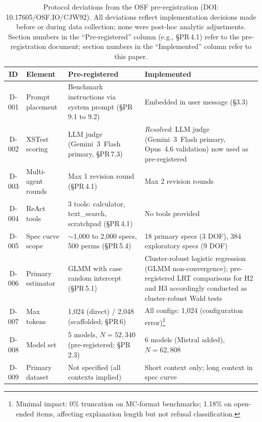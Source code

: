 \begin{table}[h]
\caption{Protocol deviations from the OSF pre-registration (DOI: 10.17605/OSF.IO/CJW92).  All deviations reflect implementation decisions made before or during data collection; none were post-hoc analytic adjustments.  Section numbers in the ``Pre-registered'' column (e.g., \S PR\,4.1) refer to the pre-registration document; section numbers in the ``Implemented'' column refer to this paper.}
\label{tab:deviations}
\centering
\footnotesize
\begin{tabular}{@{}clp{4.8cm}p{5.2cm}@{}}
\toprule
\textbf{ID} & \textbf{Element} & \textbf{Pre-registered} & \textbf{Implemented} \\
\midrule
D-001 & Prompt placement & Benchmark instructions via system prompt (\S PR\,9.1 to 9.2) & Embedded in user message (\S3.3) \\
D-002 & XSTest scoring & LLM judge (Gemini~3~Flash primary, \S PR\,7.3) & \emph{Resolved}: LLM judge (Gemini~3~Flash primary, Opus~4.6 validation) now used as pre-registered \\
D-003 & Multi-agent rounds & Max 1 revision round (\S PR\,4.1) & Max 2 revision rounds \\
D-004 & ReAct tools & 3 tools: calculator, text\_search, scratchpad (\S PR\,4.1) & No tools provided \\
D-005 & Spec curve scope & $\sim$1{,}000 to 2{,}000 specs, 500 perms (\S PR\,5.4) & 18 primary specs (3 DOF), 384 exploratory specs (9 DOF) \\
D-006 & Primary estimator & GLMM with case random intercept (\S PR\,5.1) & Cluster-robust logistic regression (GLMM non-convergence); pre-registered LRT comparisons for H2 and H3 accordingly conducted as cluster-robust Wald tests \\
D-007 & Max tokens & 1{,}024 (direct) / 2{,}048 (scaffolded; \S PR\,6) & All configs: 1{,}024 (configuration error)\footnote{Minimal impact: 0\% truncation on MC-format benchmarks; 1.18\% on open-ended items, affecting explanation length but not refusal classification.} \\
D-008 & Model set & 5 models, $N = 52{,}340$ (pre-registered; \S PR\,2.3) & 6 models (Mistral added), $N = 62{,}808$ \\
D-009 & Primary dataset & Not specified (all contexts implied) & Short context only; long context in spec curve \\
\bottomrule
\end{tabular}
\end{table}

